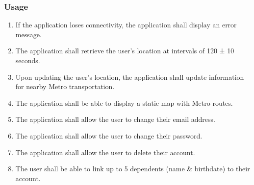 	\subsubsection{Usage}\begin{enumerate}
		\item If the application loses connectivity, the application shall display an error message.
		\item The application shall retrieve the user’s location at intervals of 120 ± 10 seconds.
		\item Upon updating the user’s location, the application shall update information for nearby Metro transportation.
		\item The application shall be able to display a static map with Metro routes.
		\item The application shall allow the user to change their email address.
		\item The application shall allow the user to change their password.
		\item The application shall allow the user to delete their account.
		\item The user shall be able to link up to 5 dependents (name \& birthdate) to their account.
	\end{enumerate}
	
